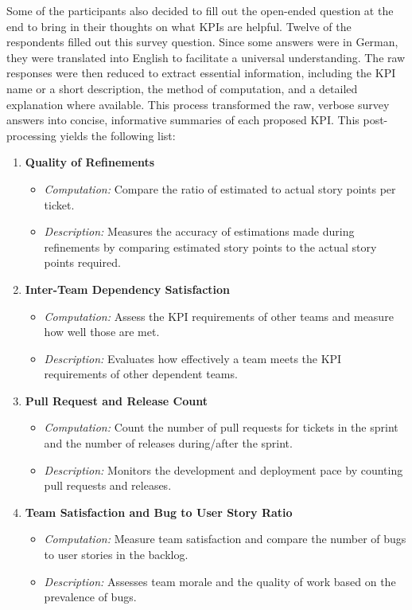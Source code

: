 Some of the participants also decided to fill out the open-ended question at the end to bring in their thoughts on what KPIs are helpful. Twelve of the respondents filled out this survey question. Since some answers were in German, they were translated into English to facilitate a universal understanding. The raw responses were then reduced to extract essential information, including the KPI name or a short description, the method of computation, and a detailed explanation where available. This process transformed the raw, verbose survey answers into concise, informative summaries of each proposed KPI.
This post-processing yields the following list: 

\begin{enumerate}
    \item \textbf{Quality of Refinements}
    \begin{itemize}
        \item \textit{Computation:} Compare the ratio of estimated to actual story points per ticket.
        \item \textit{Description:} Measures the accuracy of estimations made during refinements by comparing estimated story points to the actual story points required.
    \end{itemize}
    
    \item \textbf{Inter-Team Dependency Satisfaction}
    \begin{itemize}
        \item \textit{Computation:} Assess the KPI requirements of other teams and measure how well those are met.
        \item \textit{Description:} Evaluates how effectively a team meets the KPI requirements of other dependent teams.
    \end{itemize}

    \item \textbf{Pull Request and Release Count}
    \begin{itemize}
        \item \textit{Computation:} Count the number of pull requests for tickets in the sprint and the number of releases during/after the sprint.
        \item \textit{Description:} Monitors the development and deployment pace by counting pull requests and releases.
    \end{itemize}
    
    \item \textbf{Team Satisfaction and Bug to User Story Ratio}
    \begin{itemize}
        \item \textit{Computation:} Measure team satisfaction and compare the number of bugs to user stories in the backlog.
        \item \textit{Description:} Assesses team morale and the quality of work based on the prevalence of bugs.
    \end{itemize}


\end{enumerate}
